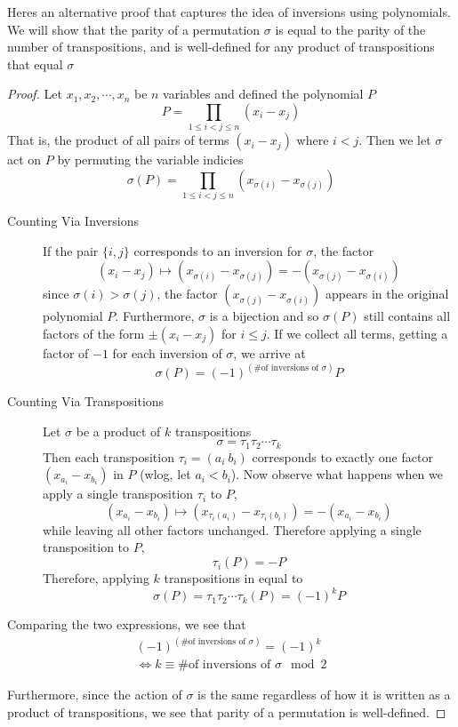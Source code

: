 \documentclass{article}
\begin{document}
\begin{remark}
    Heres an alternative proof that captures the idea of inversions using polynomials.
    We will show that the parity of a permutation $\sigma$ is equal to the parity of the number of transpositions, and is well-defined for any product of transpositions that equal $\sigma$
\end{remark}
\begin{proof}
    Let $x_1, x_2, \cdots, x_n$ be $n$ variables and defined the polynomial $P$
    \[
        P = \prod_{1\leq i < j \leq n}(x_i - x_j)  
    \]
    That is, the product of all pairs of terms $(x_i - x_j)$ where $i < j$. Then we let $\sigma$ act on $P$ by permuting the variable indicies
    \[
        \sigma(P) = \prod_{1\leq i < j \leq n}(x_{\sigma(i)} - x_{\sigma(j)})
    \]
    \begin{description}
        \item[Counting Via Inversions] If the pair $\{i, j\}$ corresponds to an inversion for $\sigma$, the factor
        \[
            (x_i - x_j) \mapsto (x_{\sigma(i)} - x_{\sigma(j)}) = - (x_{\sigma(j)} - x_{\sigma(i)})
        \]
        since $\sigma(i) > \sigma(j)$, the factor $(x_{\sigma(j)} - x_{\sigma(i)})$ appears in the original polynomial $P$.
        Furthermore, $\sigma$ is a bijection and so $\sigma(P)$ still contains all factors of the form $\pm(x_i - x_j)$ for $i \leq j$.
        If we collect all terms, getting a factor of $-1$ for each inversion of $\sigma$, we arrive at
        \[
            \sigma(P) = (-1)^{(\text{\# of inversions of } \sigma)} P  
        \]

        \item[Counting Via Transpositions] Let $\sigma$ be a product of $k$ transpositions
        \[
            \sigma = \tau_1 \tau_2 \cdots \tau_k  
        \]
        Then each transposition $\tau_i = (a_i\ b_i)$ corresponds to exactly one factor $(x_{a_i} - x_{b_i})$ in $P$ (wlog, let $a_i < b_i$).
        Now observe what happens when we apply a single transposition $\tau_i$ to $P$,
        \[
            (x_{a_i} - x_{b_i}) \mapsto (x_{\tau_i(a_i)} - x_{\tau_i(b_i)}) = - (x_{a_i} - x_{b_i})
        \]
        while leaving all other factors unchanged. Therefore applying a single transposition to $P$,
        \[
            \tau_i(P) = -P
        \]
        Therefore, applying $k$ transpositions in equal to
        \[
            \sigma(P) = \tau_1 \tau_2 \cdots \tau_k (P) = (-1)^{k}P 
        \]
    \end{description}
    Comparing the two expressions, we see that
    \begin{align*}
        (-1)^{(\text{\# of inversions of } \sigma)} = (-1)^{k} \\
        \Leftrightarrow k \equiv \text{\# of inversions of } \sigma \mod 2 
    \end{align*}
    
    Furthermore, since the action of $\sigma$ is the same regardless of how it is written as a product of transpositions, 
    we see that parity of a permutation is well-defined.
\end{proof}
\end{document}
